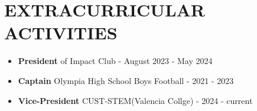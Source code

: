 \documentclass[letterpaper,11pt]{article}
\newcommand{\resumeItem}[1]{
  \item\small{
    {#1 \vspace{-1pt}}
  }
}
\newcommand{\resumeItemListStart}{\begin{itemize}[leftmargin=0.1in]}
\newcommand{\resumeItemListEnd}{\end{itemize}\vspace{-5pt}}
\begin{document}
    

    
      

\section{\color{airforceblue}EXTRACURRICULAR ACTIVITIES}
    
      \resumeItemListStart
        \resumeItem{\normalsize{\textbf{President} of Impact Club - {August 2023 - May 2024} }} 
        \vspace{-5pt}
        
        \resumeItem{\normalsize{\textbf{Captain} Olympia High School Boys Football - } {2021 - 2023}}     \resumeItem{\normalsize{\textbf{Vice-President} CUST-STEM(Valencia Collge) - } {2024 - current }}    
        \vspace{-5pt}

      \resumeItemListEnd 
      
\vspace{-12pt}
\end{document}
